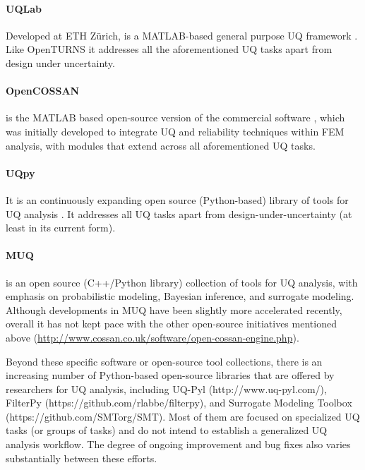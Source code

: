 \paragraph{UQLab} Developed at ETH Zürich,  is a MATLAB-based general purpose UQ framework \citep{marelli2014uqlab}. Like OpenTURNS it addresses all the aforementioned UQ tasks apart from design under uncertainty. 

\paragraph{OpenCOSSAN} 
 is the MATLAB based open-source version of the commercial software  \citep{patelli2017cossan}, which was initially developed to integrate UQ and reliability techniques within FEM analysis, with modules that extend across all aforementioned UQ tasks.

\paragraph{UQpy} It is an continuously expanding open source (Python-based) library of tools for UQ analysis \citep{olivier2020uqpy}. It addresses all UQ tasks apart from design-under-uncertainty (at least in its current form).

\paragraph{MUQ} 
 is an open source (C++/Python library) collection of tools for UQ analysis, with emphasis on probabilistic modeling, Bayesian inference, and surrogate modeling. Although developments in MUQ have been slightly more accelerated recently, overall it has not kept pace with the other open-source initiatives mentioned above (\url{http://www.cossan.co.uk/software/open-cossan-engine.php}).


\vspace{2mm}  
Beyond these specific software or open-source tool collections, there is an increasing number of Python-based open-source libraries that are offered by researchers for UQ analysis, including UQ-Pyl (http://www.uq-pyl.com/), FilterPy (https://github.com/rlabbe/filterpy), and Surrogate Modeling Toolbox (https://github.com/SMTorg/SMT). Most of them are focused on specialized UQ tasks (or groups of tasks) and do not intend to establish a generalized UQ analysis workflow. The degree of ongoing improvement and bug fixes also varies substantially between these efforts. 

